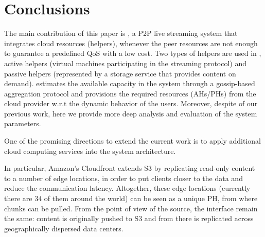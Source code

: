 {\section{Conclusions} \label{sec:conclusion}

The main contribution of this paper is \clive, a P2P live streaming system
that integrates cloud resources (helpers), whenever the peer resources are not
enough to guarantee a predefined QoS with a low cost. Two types of helpers are
used in \clive, active helpers (virtual machines participating in the streaming
protocol) and passive helpers (represented by a storage service that
provides content on demand). \clive estimates the available capacity in the
system through a gossip-based aggregation protocol and provisions the required
resources (AHs/PHs) from the cloud provider w.r.t the dynamic behavior of the
users.
%
Moreover, despite of our previous \clive work, here we provide more deep analysis
and evaluation of the system parameters.

One of the promising directions to extend the current work is to apply 
additional cloud computing services into the system architecture.

In particular, Amazon's Cloudfront extends S3 by
replicating read-only content to a number of edge locations, in order
to put clients closer to the data and reduce the communication latency.
Altogether, these edge locations (currently there are $34$ of them around the
world) can be seen as a unique PH, from where chunks can be pulled. From the
point of view of the source, the interface remain the same: content is
originally pushed to S3 and from there is replicated across geographically
dispersed data centers.

}
